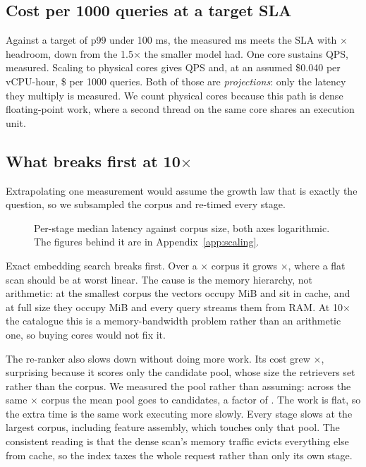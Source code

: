 \subsection{Cost per 1000 queries at a target SLA}

Against a target of p99 under 100 ms, the measured \BenchPninetynine{} ms meets the SLA with
\BenchHeadroom$\times$ headroom, down from the 1.5$\times$ the smaller model had. One core
sustains \BenchSerialQPS{} QPS, measured. Scaling to \BenchCores{} physical cores gives
\BenchCapacityQPS{} QPS and, at an assumed \$0.040 per vCPU-hour, \$\BenchCost{} per 1000 queries. Both of those are \emph{projections}: only the latency they multiply is measured. We
count physical cores because this path is dense floating-point work, where a second thread on the
same core shares an execution unit.

\subsection{What breaks first at 10$\times$}

Extrapolating one measurement would assume the growth law that is exactly the question, so we
subsampled the corpus and re-timed every stage.

\begin{figure}[t]
\centering

\caption{Per-stage median latency against corpus size, both axes logarithmic. The figures
behind it are in Appendix~\ref{app:scaling}.}
\label{fig:scaling}
\end{figure}

Exact embedding search breaks first. Over a \BenchCorpusGrowth$\times$ corpus it grows
\BenchAnnGrowth$\times$, where a flat scan should be at worst linear. The cause is the memory
hierarchy, not arithmetic: at the smallest corpus the vectors occupy \BenchFaissSmall{} MiB and
sit in cache, and at full size they occupy \BenchFaissFull{} MiB and every query streams them from
RAM. At 10$\times$ the catalogue this is a memory-bandwidth problem rather than an arithmetic one,
so buying cores would not fix it.

The re-ranker also slows down without doing more work. Its cost grew
\BenchRerankGrowth$\times$, surprising because it scores only the candidate pool, whose size the
retrievers set rather than the corpus. We measured the pool rather than assuming: across the same
\BenchCorpusGrowth$\times$ corpus the mean pool goes \PoolSmall{} to \PoolFull{} candidates, a
factor of \PoolGrowth. The work is flat, so the extra time is the same work executing more slowly.
Every stage slows at the largest corpus, including feature assembly, which touches only that pool.
The consistent reading is that the dense scan's memory traffic evicts everything else from cache,
so the index taxes the whole request rather than only its own stage.

